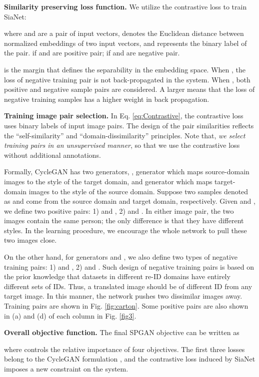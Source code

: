 \documentclass[10pt,twocolumn,letterpaper]{article}
\begin{document}
\textbf{Similarity preserving loss function.}
We utilize the contrastive loss \cite{DBLP:conf/cvpr/HadsellCL06} to train SiaNet:

{where  and  are a pair of input vectors,  denotes the Euclidean distance between normalized embeddings of two input vectors, and   represents the binary label of the pair.  if  and  are positive pair;  if  and  are negative pair.

 is the margin that defines the separability in the embedding space.
When , the {loss of negative training pair is not back-propagated in the system. When , both positive and negative sample pairs are considered.} A larger  means that the loss of negative training samples has a higher weight in back propagation. 


\textbf{Training image pair selection.} In Eq. \ref{eq:Contrastive}, the contrastive loss uses binary labels of input image pairs. The design of the pair similarities reflects the ``self-similarity'' and ``domain-dissimilarity'' principles. Note that, \emph{we select training pairs in an unsupervised manner}, so that we use the contrastive loss without additional annotations.

Formally, CycleGAN has two generators, \ie, generator  which maps source-domain images to the style of the target domain, and generator  which maps target-domain images to the style of the source domain. Suppose two samples denoted as  and  come from the source domain and target domain, respectively. Given  and , we define two positive pairs: 1)  and , 2)  and . In either image pair, the two images contain the same person; the only difference is that they have different styles. In the learning procedure, we encourage the whole network to pull these two images close. 

On the other hand, for generators  and , we also define two types of  negative training pairs: 1)  and , 2)  and . Such design of negative training pairs is based on the prior knowledge that datasets in different re-ID domains have entirely different sets of IDs. Thus, a translated image should be of  different ID from any target image. In this manner, the network pushes two dissimilar images away. Training pairs are shown in Fig. \ref{fig:carton}. Some positive pairs are also shown in (a) and (d) of each column in Fig. \ref{fig3}.


\textbf{Overall objective function.}
The final SPGAN objective can be written as

\label{eq:Objective}where  controls the relative importance of four objectives. The first three losses belong to the CycleGAN formulation \cite{cycle}, and the contrastive loss induced by SiaNet imposes a new constraint on the system. 


}
\end{document}
